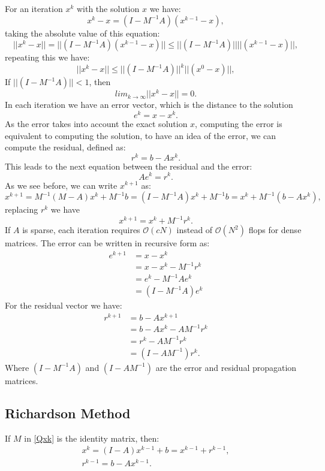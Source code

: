 \documentclass[a4paper,10pt]{report}
\begin{document}
For an iteration $x^{k}$ with the solution $x$ we have:
\begin{equation*}
x^k-x=(I-M^{-1}A)(x^{k-1}-x),
\end{equation*}
taking the absolute value of this equation:
\begin{equation*}
||x^k-x||=||(I-M^{-1}A)(x^{k-1}-x)|| \leq ||(I-M^{-1}A)||||(x^{k-1}-x)||,
\end{equation*}
repeating this we have:
\begin{equation*}
||x^k-x||\leq ||(I-M^{-1}A)||^k||(x^0-x)||,
\end{equation*}
If $||(I-M^{-1}A)||<1$, then
\begin{equation*}
lim_{k \rightarrow \infty}||x^k-x||=0.
\end{equation*}
In each iteration we have an error vector, which is the distance to the solution 
$$e^k=x-x^k.$$
As the error takes into account the exact solution $x$, computing the error is equivalent to computing the 
solution, to have an idea of the error, we can compute the residual, defined as:
$$r^k=b-Ax^k.$$
This leads to the next equation between the residual and the error:
$$Ae^k=r^k.$$
As we see before, we can write $x^{k+1}$ as:
$$x^{k+1}=M^{-1}(M-A)x^k+M^{-1}b=(I-M^{-1}A)x^k+M^{-1}b=x^k+M^{-1}(b-Ax^k),$$
replacing $r^k$ we have
$$x^{k+1}=x^k+M^{-1}r^k.$$
If $A$ is sparse, each iteration requires $\mathcal{O}(cN)$ instead of $\mathcal{O}(N^2)$ flops for dense matrices.
The error can be written in recursive form as:
\begin{align*}
e^{k+1}&= x-x^k\\
&=x-x^k-M^{-1}r^k\\
&=e^k-M^{-1}Ae^k\\
&=(I-M^{-1}A)e^k
\end{align*}
For the residual vector we have:
\begin{align*}
r^{k+1}&= b-Ax^{k+1}\\
&=b-Ax^k-AM^{-1}r^k\\
&=r^k-AM^{-1}r^k\\
&=(I-AM^{-1})r^k.
\end{align*}
Where $(I-M^{-1}A)$ and $(I-AM^{-1})$ are the error and residual propagation matrices.
\subsection{Richardson Method}
If $M$ in \eqref{Qxk} is the identity matrix, then:
\begin{gather*}
x^k=(I-A)x^{k-1}+b=x^{k-1}+r^{k-1}, \\
r^{k-1}=b-Ax^{k-1}.
\end{gather*}
\end{document}
